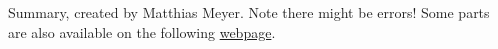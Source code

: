 \documentclass[12pt]{article}
\begin{document}
            
            
            
            
            
            
            
            
            
            
Summary, created by Matthias Meyer. Note there might be errors!
\tableofcontents 
Some parts are also available on the following \href{https://mmeyer.tech/category/knowledge/math/}{webpage}.
% 
% 
% 
% 

% 
% 
% 
% 
% 
% 
% 
% 
% 
% 
% 
% 
% 
% 
% 
% 
% 
% 
% 
% 
\end{document}
